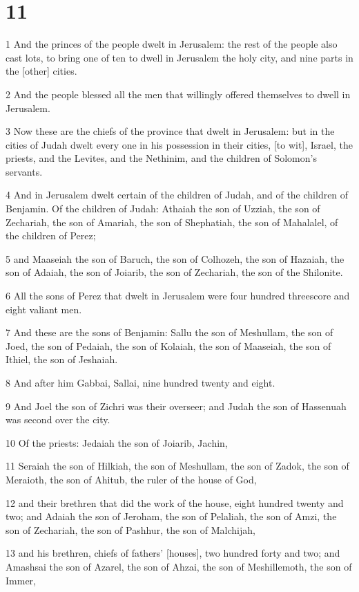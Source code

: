 \chapter{11}

\par 1 And the princes of the people dwelt in Jerusalem: the rest of the people also cast lots, to bring one of ten to dwell in Jerusalem the holy city, and nine parts in the [other] cities.
\par 2 And the people blessed all the men that willingly offered themselves to dwell in Jerusalem.
\par 3 Now these are the chiefs of the province that dwelt in Jerusalem: but in the cities of Judah dwelt every one in his possession in their cities, [to wit], Israel, the priests, and the Levites, and the Nethinim, and the children of Solomon's servants.
\par 4 And in Jerusalem dwelt certain of the children of Judah, and of the children of Benjamin. Of the children of Judah: Athaiah the son of Uzziah, the son of Zechariah, the son of Amariah, the son of Shephatiah, the son of Mahalalel, of the children of Perez;
\par 5 and Maaseiah the son of Baruch, the son of Colhozeh, the son of Hazaiah, the son of Adaiah, the son of Joiarib, the son of Zechariah, the son of the Shilonite.
\par 6 All the sons of Perez that dwelt in Jerusalem were four hundred threescore and eight valiant men.
\par 7 And these are the sons of Benjamin: Sallu the son of Meshullam, the son of Joed, the son of Pedaiah, the son of Kolaiah, the son of Maaseiah, the son of Ithiel, the son of Jeshaiah.
\par 8 And after him Gabbai, Sallai, nine hundred twenty and eight.
\par 9 And Joel the son of Zichri was their overseer; and Judah the son of Hassenuah was second over the city.
\par 10 Of the priests: Jedaiah the son of Joiarib, Jachin,
\par 11 Seraiah the son of Hilkiah, the son of Meshullam, the son of Zadok, the son of Meraioth, the son of Ahitub, the ruler of the house of God,
\par 12 and their brethren that did the work of the house, eight hundred twenty and two; and Adaiah the son of Jeroham, the son of Pelaliah, the son of Amzi, the son of Zechariah, the son of Pashhur, the son of Malchijah,
\par 13 and his brethren, chiefs of fathers' [houses], two hundred forty and two; and Amashsai the son of Azarel, the son of Ahzai, the son of Meshillemoth, the son of Immer,
